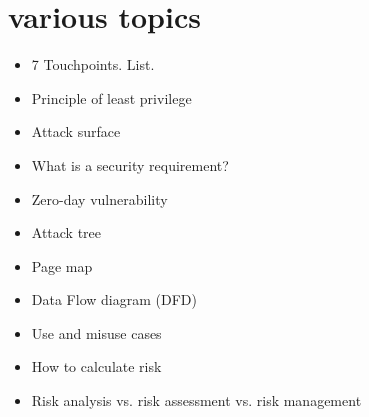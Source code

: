 \chapter{various topics}
	\begin{itemize}
		\item 7 Touchpoints. List.
		\item Principle of least privilege
		\item Attack surface
		\item What is a security requirement?
		\item Zero-day vulnerability
		\item Attack tree
		\item Page map
		\item Data Flow diagram (DFD)
		\item Use and misuse cases
		\item How to calculate risk
		\item Risk analysis vs. risk assessment vs. risk management

	\end{itemize}